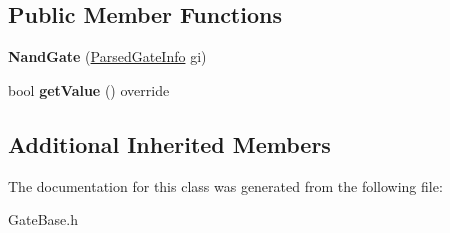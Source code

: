 \subsection*{Public Member Functions}
\begin{DoxyCompactItemize}
\item 
{\bfseries Nand\+Gate} (\hyperlink{structParsedGateInfo}{Parsed\+Gate\+Info} gi)\hypertarget{classNandGate_a96962055c3a740014879962a83f0f90f}{}\label{classNandGate_a96962055c3a740014879962a83f0f90f}

\item 
bool {\bfseries get\+Value} () override\hypertarget{classNandGate_aaf2253a24b027624e761333fa28c3495}{}\label{classNandGate_aaf2253a24b027624e761333fa28c3495}

\end{DoxyCompactItemize}
\subsection*{Additional Inherited Members}


The documentation for this class was generated from the following file\+:\begin{DoxyCompactItemize}
\item 
Gate\+Base.\+h\end{DoxyCompactItemize}
